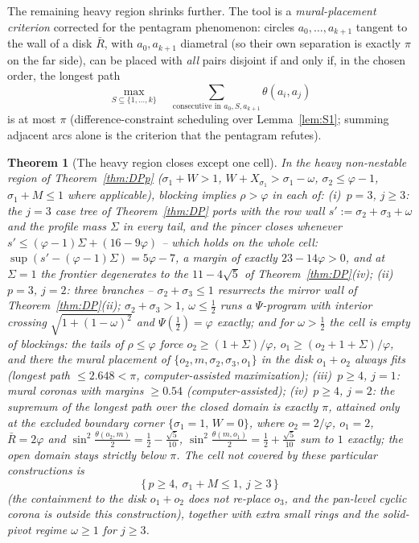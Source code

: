 \documentclass[11pt]{article}
\newtheorem{theorem}{Theorem}
\theoremstyle{definition}
\begin{document}
The remaining heavy region shrinks further. The tool is a
\emph{mural-placement criterion} corrected for the pentagram
phenomenon: circles $a_0,\dots,a_{k+1}$ tangent to the wall of a disk
$\bar R$, with $a_0,a_{k+1}$ diametral (so their own separation is
exactly $\pi$ on the far side), can be placed with \emph{all} pairs
disjoint if and only if, in the chosen order, the longest path
\[
\max_{S\subseteq\{1,\dots,k\}}\quad
\sum_{\text{consecutive in }a_0,S,a_{k+1}}\theta(a_i,a_j)
\]
is at most $\pi$ (difference-constraint scheduling
over Lemma~\ref{lem:S1}; summing adjacent arcs alone is the criterion
that the pentagram refutes).

\begin{theorem}[The heavy region closes except one cell]\label{thm:DPr}
In the heavy non-nestable region of Theorem~\ref{thm:DPp}
($\sigma_1+W>1$, $W+X_{\sigma_1}>\sigma_1-\omega$,
$\sigma_2\le\varphi-1$, $\sigma_1+M\le1$ where applicable), blocking
implies $\rho>\varphi$ in each of: (i)~$p=3$, $j\ge3$: the $j=3$ case
tree of Theorem~\ref{thm:DP} ports with the row wall
$s':=\sigma_2+\sigma_3+\omega$ and the profile mass $\Sigma$ in every
tail, and the pincer closes whenever
$s'\le(\varphi-1)\Sigma+(16-9\varphi)$ -- which holds on the whole
cell: $\sup(s'-(\varphi-1)\Sigma)=5\varphi-7$, a margin of exactly
$23-14\varphi>0$, and at $\Sigma=1$ the frontier degenerates to the
$11-4\sqrt5$ of Theorem~\ref{thm:DP}(iv); (ii)~$p=3$, $j=2$: three
branches -- $\sigma_2+\sigma_3\le1$ resurrects the mirror wall of
Theorem~\ref{thm:DP}(ii); $\sigma_2+\sigma_3>1$, $\omega\le\tfrac12$
runs a $\Psi$-program with interior crossing
$\sqrt{1+(1-\omega)^2}$ and $\Psi(\tfrac12)=\varphi$ exactly; and for
$\omega>\tfrac12$ the cell is \emph{empty of blockings}: the tails of
$\rho\le\varphi$ force $o_2\ge(1+\Sigma)/\varphi$,
$o_1\ge(o_2+1+\Sigma)/\varphi$, and there the mural placement of
$\{o_2,m,\sigma_2,\sigma_3,o_1\}$ in the disk $o_1+o_2$ always fits
(longest path $\le2.648<\pi$, computer-assisted maximization);
(iii)~$p\ge4$, $j=1$: mural coronas with margins $\ge0.54$
(computer-assisted); (iv)~$p\ge4$, $j=2$: the supremum of the longest
path over the closed domain is exactly $\pi$, attained only at the
excluded boundary corner $\{\sigma_1=1,\,W=0\}$, where $o_2=2/\varphi$,
$o_1=2$, $\bar R=2\varphi$ and
$\sin^2\tfrac{\theta(o_2,m)}2=\tfrac12-\tfrac{\sqrt5}{10}$,
$\sin^2\tfrac{\theta(m,o_1)}2=\tfrac12+\tfrac{\sqrt5}{10}$ sum to $1$
exactly; the open domain stays strictly below $\pi$. The cell not
covered by these particular constructions is
\[
\{\,p\ge4,\ \sigma_1+M\le1,\ j\ge3\,\}
\]
(the containment to the disk $o_1+o_2$ does not re-place $o_3$, and
the pan-level cyclic corona is outside this construction), together with extra small
rings and the solid-pivot regime $\omega\ge1$ for $j\ge3$.
\end{theorem}
\end{document}
